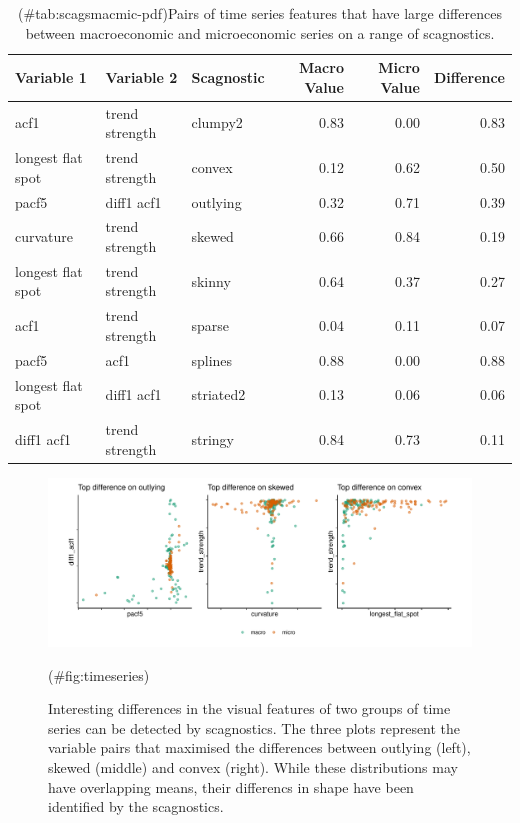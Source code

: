 \begin{Schunk}
\begin{table}

\caption{(\#tab:scagsmacmic-pdf)Pairs of time series features that have large differences between macroeconomic and microeconomic series on a range of scagnostics.}
\centering
\begin{tabular}[t]{lllrrr}
\toprule
Variable 1 & Variable 2 & Scagnostic & Macro Value & Micro Value & Difference\\
\midrule
acf1 & trend strength & clumpy2 & 0.83 & 0.00 & 0.83\\
longest flat spot & trend strength & convex & 0.12 & 0.62 & 0.50\\
pacf5 & diff1 acf1 & outlying & 0.32 & 0.71 & 0.39\\
curvature & trend strength & skewed & 0.66 & 0.84 & 0.19\\
longest flat spot & trend strength & skinny & 0.64 & 0.37 & 0.27\\
\addlinespace
acf1 & trend strength & sparse & 0.04 & 0.11 & 0.07\\
pacf5 & acf1 & splines & 0.88 & 0.00 & 0.88\\
longest flat spot & diff1 acf1 & striated2 & 0.13 & 0.06 & 0.06\\
diff1 acf1 & trend strength & stringy & 0.84 & 0.73 & 0.11\\
\bottomrule
\end{tabular}
\end{table}

\end{Schunk}

\begin{Schunk}
\begin{figure}
\includegraphics[width=1\linewidth]{mason-lee-laa-cook_files/figure-latex/timeseries-1} \caption[Interesting differences in the visual features of two groups of time series can be detected by scagnostics]{Interesting differences in the visual features of two groups of time series can be detected by scagnostics. The three plots represent the variable pairs that maximised the differences between outlying (left), skewed (middle) and convex (right). While these distributions may have overlapping means, their differencs in shape have been identified by the scagnostics.}(\#fig:timeseries)
\end{figure}
\end{Schunk}

